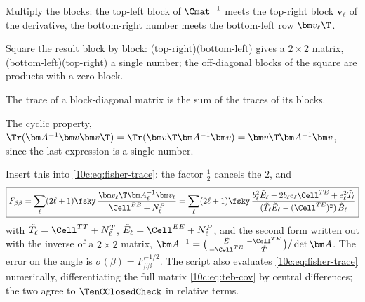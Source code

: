 \begin{explain}
  \item Multiply the blocks: the top-left block of $\Cmat^{-1}$ meets the top-right block $\bm v_\ell$ of the
        derivative, the bottom-right number meets the bottom-left row $\bm v_\ell\T$.
  \item Square the result block by block: (top-right)(bottom-left) gives a $2\times2$ matrix,
        (bottom-left)(top-right) a single number; the off-diagonal blocks of the square are products with a zero
        block.
  \item The trace of a block-diagonal matrix is the sum of the traces of its blocks.
  \item The cyclic property, $\Tr(\bm A^{-1}\bm v\bm v\T)=\Tr(\bm v\T\bm A^{-1}\bm v)=\bm v\T\bm A^{-1}\bm v$, since the
        last expression is a single number.
\end{explain}
Insert this into \eqref{10c:eq:fisher-trace}: the factor $\frac12$ cancels the $2$, and
\begin{equation}
  \boxed{F_{\beta\beta}=\sum_\ell(2\ell+1)\fsky\,\frac{\bm v_\ell\T\bm A_\ell^{-1}\bm v_\ell}{\Cell^{BB}+N^P_\ell}
  =\sum_\ell(2\ell+1)\fsky\,
  \frac{b_\ell^2\tilde E_\ell-2b_\ell e_\ell\Cell^{TE}+e_\ell^2\tilde T_\ell}{(\tilde T_\ell\tilde E_\ell-(\Cell^{TE})^2)\,\tilde B_\ell}}
  \label{10c:eq:fisher-beta}
\end{equation}
with $\tilde T_\ell=\Cell^{TT}+N^T_\ell$, $\tilde E_\ell=\Cell^{EE}+N^P_\ell$, and the second form written out with the
inverse of a $2\times2$ matrix, $\bm A^{-1}=\bigl(\begin{smallmatrix}\tilde E&-\Cell^{TE}\\-\Cell^{TE}&\tilde T\end{smallmatrix}\bigr)/\det\bm A$.
The error on the angle is $\sigma(\beta)=F_{\beta\beta}^{-1/2}$. The script  also
evaluates \eqref{10c:eq:fisher-trace} numerically, differentiating the full matrix \eqref{10c:eq:teb-cov} by central
differences; the two agree to $\TenCClosedCheck$ in relative terms.

